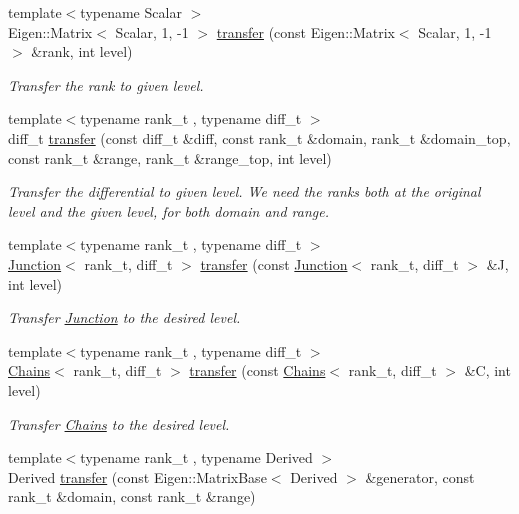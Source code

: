 \begin{DoxyCompactItemize}
{\footnotesize template$<$typename Scalar $>$ }\\Eigen\+::\+Matrix$<$ Scalar, 1, -\/1 $>$ \hyperlink{namespaceMackey_a671613d53fc3b0c9c4b115bc8b2797e6}{transfer} (const Eigen\+::\+Matrix$<$ Scalar, 1, -\/1 $>$ \&rank, int level)
\begin{DoxyCompactList}\small\item\em Transfer the rank to given level. \end{DoxyCompactList}\item 
{\footnotesize template$<$typename rank\+\_\+t , typename diff\+\_\+t $>$ }\\diff\+\_\+t \hyperlink{namespaceMackey_ad7524839b58c80d4b2c54827e4833b12}{transfer} (const diff\+\_\+t \&diff, const rank\+\_\+t \&domain, rank\+\_\+t \&domain\+\_\+top, const rank\+\_\+t \&range, rank\+\_\+t \&range\+\_\+top, int level)
\begin{DoxyCompactList}\small\item\em Transfer the differential to given level. We need the ranks both at the original level and the given level, for both domain and range. \end{DoxyCompactList}\item 
{\footnotesize template$<$typename rank\+\_\+t , typename diff\+\_\+t $>$ }\\\hyperlink{classMackey_1_1Junction}{Junction}$<$ rank\+\_\+t, diff\+\_\+t $>$ \hyperlink{namespaceMackey_a914aba7f868e67ae3fd9da3995678660}{transfer} (const \hyperlink{classMackey_1_1Junction}{Junction}$<$ rank\+\_\+t, diff\+\_\+t $>$ \&J, int level)
\begin{DoxyCompactList}\small\item\em Transfer \hyperlink{classMackey_1_1Junction}{Junction} to the desired level. \end{DoxyCompactList}\item 
{\footnotesize template$<$typename rank\+\_\+t , typename diff\+\_\+t $>$ }\\\hyperlink{classMackey_1_1Chains}{Chains}$<$ rank\+\_\+t, diff\+\_\+t $>$ \hyperlink{namespaceMackey_a50837580391b5c6705e23c637d742b22}{transfer} (const \hyperlink{classMackey_1_1Chains}{Chains}$<$ rank\+\_\+t, diff\+\_\+t $>$ \&C, int level)
\begin{DoxyCompactList}\small\item\em Transfer \hyperlink{classMackey_1_1Chains}{Chains} to the desired level. \end{DoxyCompactList}\item 
{\footnotesize template$<$typename rank\+\_\+t , typename Derived $>$ }\\Derived \hyperlink{namespaceMackey_a0550bf97e47b3c319cb5e1bd81008d89}{transfer} (const Eigen\+::\+Matrix\+Base$<$ Derived $>$ \&generator, const rank\+\_\+t \&domain, const rank\+\_\+t \&range)

\end{DoxyCompactItemize}
